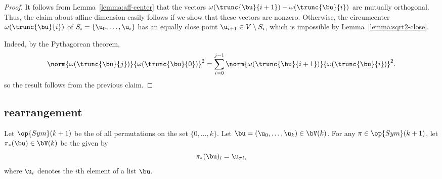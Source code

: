 \begin{proof}
It follows from  Lemma~\ref{lemma:aff-center} that the vectors 
${\omega(\trunc{\bu}{i+1})}-{\omega(\trunc{\bu}{i})}$ are mutually orthogonal.
Thus, the claim about affine dimension easily follows if we show that these vectors
are nonzero.
Otherwise, the
circumcenter $\omega(\trunc{\bu}{i})$ of $S_i=\{\u_0,\ldots,\u_i\}$
has an equally close point $ \u_{i+1}\in V\setminus S_i$, which is
impossible by Lemma~\ref{lemma:sqrt2-close}.

Indeed, by the Pythagorean theorem,
\begin{equation} 
\norm{\omega(\trunc{\bu}{j})}{\omega(\trunc{\bu}{0})}^2 =
\sum_{i=0}^{j-1} \norm{\omega(\trunc{\bu}{i+1})}{\omega(\trunc{\bu}{i})}^2.
\end{equation}
so the result follows from the
previous claim.
\end{proof}




\subsection{rearrangement}


Let $\op{Sym}(k+1)$ be the  of all permutations on the
set $\{0,\ldots,k\}$.  Let $\bu = ( \u_0,\ldots, \u_k)\in \bV(k)$.  For any
 $\pi\in\op{Sym}(k+1)$, let $\pi_*(\bu)\in
\bV(k)$ be the  given by
\begin{displaymath} 
\pi_*(\bu)_i =  \u_{\pi i},
\end{displaymath}   
where $\u_i$ denotes the $i$th element of a list $\bu$.


